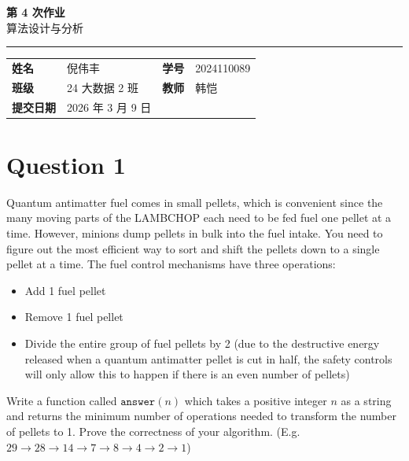 \documentclass[12pt,a4paper]{article}
\newcommand{\course}{算法设计与分析}
\newcommand{\homeworktitle}{第 4 次作业}
\newcommand{\studentname}{倪伟丰}
\newcommand{\studentid}{2024110089}
\newcommand{\classname}{24 大数据 2 班}
\newcommand{\teacher}{韩恺}
\newcommand{\duedate}{2026 年 3 月 9 日}
\begin{document}
\begin{center}
  {\Huge\bfseries\color{mainblue}\homeworktitle}\\[0.6em]
  {\Large\course}\\[1.2em]
  {\color{linegray}\rule{0.9\textwidth}{0.8pt}}
\end{center}

\begin{infobox}
\begin{tabularx}{\textwidth}{>{\bfseries}p{2.2cm} X >{\bfseries}p{2.2cm} X}
姓名 & \studentname & 学号 & \studentid \\
班级 & \classname & 教师 & \teacher \\
提交日期 & \duedate &  &  \\
\end{tabularx}
\end{infobox}

\section{Question 1}

Quantum antimatter fuel comes in small pellets, which is convenient since the many moving parts of the LAMBCHOP each need to be fed fuel one pellet at a time. However, minions dump pellets in bulk into the fuel intake. You need to figure out the most efficient way to sort and shift the pellets down to a single pellet at a time. The fuel control mechanisms have three operations:
\begin{itemize}
    \item Add 1 fuel pellet
    \item Remove 1 fuel pellet
    \item Divide the entire group of fuel pellets by 2 (due to the destructive energy released when a quantum antimatter pellet is cut in half, the safety controls will only allow this to happen if there is an even number of pellets)
\end{itemize}

Write a function called $\texttt{answer}(n)$ which takes a positive integer $n$ as a string and returns the minimum number of operations needed to transform the number of pellets to 1. Prove the correctness of your algorithm. (E.g. $29 \to 28 \to 14 \to 7 \to 8 \to 4 \to 2 \to 1$)
\end{document}
